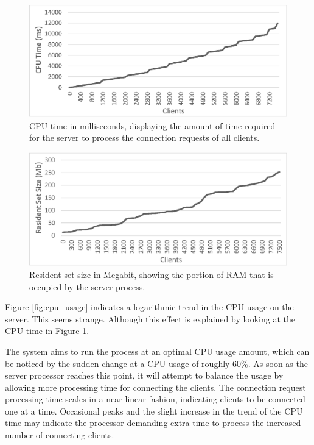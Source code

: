 \documentclass[bsc, 12pt, twoside, singlespacing, parskip, abbrevs, notimes, normalheadings, logo]{styles/infthesis}
\begin{document}
\begin{figure}[H]
\centering
\includegraphics[scale=0.9]{images/test_CLIENT_CPUtime.eps}
\caption{CPU time in milliseconds, displaying the amount of time required for the server to process the connection requests of all clients.}
\label{fig:cpu_time}
\end{figure}

\begin{figure}[H]
\centering
\includegraphics[scale=0.9]{images/test_CLIENT_RSS.eps}
%
\caption{Resident set size in Megabit, showing the portion of RAM that is occupied by the server process.}
\label{fig:cpu_rss}
\end{figure}

Figure \ref{fig:cpu_usage} indicates a logarithmic trend in the CPU usage on the server. This seems strange. Although this effect is explained by looking at the CPU time in Figure \ref{fig:cpu_time}. 

The system aims to run the process at an optimal CPU usage amount, which can be noticed by the sudden change at a CPU usage of roughly 60\%. As soon as the server processor reaches this point, it will attempt to balance the usage by allowing more processing time for connecting the clients. The connection request processing time scales in a near-linear fashion, indicating clients to be connected one at a time. Occasional peaks and the slight increase in the trend of the CPU time may indicate the processor demanding extra time to process the increased number of connecting clients.
\end{document}

